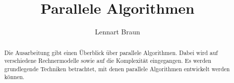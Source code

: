 \documentclass[a4paper]{llncs}
\begin{document}
\pagestyle{headings}

\title{Parallele Algorithmen}

\author{Lennart Braun}


\maketitle

\begin{abstract}
Die Ausarbeitung gibt einen Überblick über parallele Algorithmen.
Dabei wird auf verschiedene Rechnermodelle sowie auf die Komplexität
eingegangen.
Es werden grundlegende Techniken betrachtet, mit denen parallele Algorithmen
entwickelt werden können.

\end{abstract}

\tableofcontents

\newpage









\clearpage
\printbibliography
\end{document}
